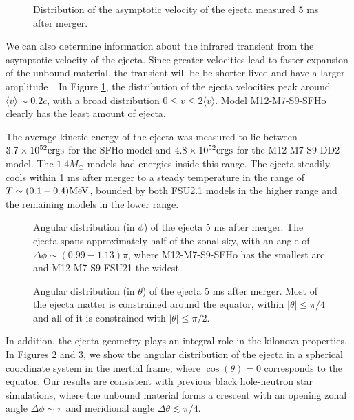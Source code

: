 \begin{figure}
	\centering
	
	\caption[Distribution of the asymptotic velocity of the ejecta]{
		Distribution of the asymptotic velocity of the ejecta measured 5 ms after merger.
	}
	\label{fig:vrhisto}
\end{figure}

We can also determine information about the infrared transient from the asymptotic velocity of the ejecta.  
Since greater velocities lead to faster expansion of the unbound material, the transient will be be shorter lived and have a larger amplitude~\cite{2013ApJ...775...18B,Barnes:2016}. 
In Figure \ref{fig:vrhisto}, the distribution of the ejecta velocities peak around $\langle v \rangle \sim 0.2 c$, with a broad distribution  $ 0 \le v \le 2 \langle v \rangle $.
Model M12-M7-S9-SFHo clearly has the least amount of ejecta.

The average kinetic energy of the ejecta was measured to lie between $3.7 \times 10^{52} {\rm ergs} $ for the SFHo model and $4.8 \times 10^{52} {\rm ergs} $ for the M12-M7-S9-DD2 model.  
The $1.4 M_\odot$ models had energies inside this range. 
The ejecta steadily cools within 1 ms after merger to a steady temperature in the range of $T \sim (0.1 - 0.4) {\rm MeV}$, bounded by both FSU2.1 models in the higher range and the remaining models in the lower range.

\begin{figure}
	\centering
	
	\caption[Angular distribution (in $\phi$) of the ejecta]{
		Angular distribution (in $\phi$) of the ejecta 5 ms after merger.  The ejecta spans approximately half of the zonal sky, with an angle of $\Delta \phi \sim (0.99-1.13) \pi$, where M12-M7-S9-SFHo has the smallest arc and M12-M7-S9-FSU21 the widest.
	}
	\label{fig:phihisto}
\end{figure}

\begin{figure}
	\centering
	
	\caption[Angular distribution (in $\theta$) of the ejecta]{
		Angular distribution (in $\theta$) of the ejecta 5 ms after merger.  
		Most of the ejecta matter is constrained around the equator, within $|\theta| \leq \pi/4$ and all of it is constrained with $|\theta| \leq \pi/2$.
	}
	\label{fig:costhetahisto}
\end{figure}


In addition, the ejecta geometry plays an integral role in the kilonova properties.  
In Figures \ref{fig:phihisto} and \ref{fig:costhetahisto}, we show the angular distribution of the ejecta in a spherical coordinate system in the inertial frame, where $\cos(\theta) = 0$ corresponds to the equator.  
Our results are consistent with previous black hole-neutron star simulations, where the unbound material forms a crescent with an opening zonal angle $\Delta \phi \sim \pi$ and meridional angle $\Delta \theta \lesssim \pi/4$.


